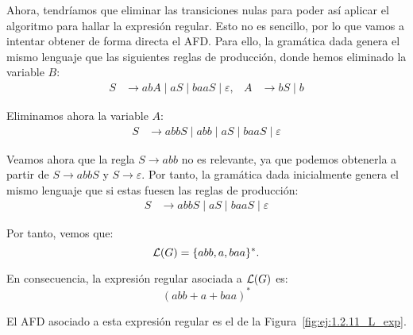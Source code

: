 \begin{ejercicio}
    Ahora, tendríamos que eliminar las transiciones nulas para poder así aplicar el algoritmo para hallar la expresión regular. Esto no es sencillo, por lo que vamos a intentar obtener de forma directa el AFD\@. Para ello, la gramática dada genera el mismo lenguaje que las siguientes reglas de producción, donde hemos eliminado la variable $B$:
    \begin{align*}
        S &\to abA \mid aS \mid baaS \mid \varepsilon, & A &\to bS \mid b
    \end{align*}

    Eliminamos ahora la variable $A$:
    \begin{align*}
        S &\to abbS \mid abb \mid aS \mid baaS \mid \varepsilon
    \end{align*}

    Veamos ahora que la regla $S \to abb$ no es relevante, ya que podemos obtenerla a partir de $S \to abbS$ y $S \to \varepsilon$. Por tanto, la gramática dada inicialmente genera el mismo lenguaje que si estas fuesen las reglas de producción:
    \begin{align*}
        S &\to abbS \mid aS \mid baaS \mid \varepsilon
    \end{align*}

    Por tanto, vemos que:
    \begin{equation*}
        \mathcal{L}(G)=\{abb, a, baa\}^*.
    \end{equation*}

    En consecuencia, la expresión regular asociada a $\mathcal{L}(G)$ es:
    \begin{equation*}
        (abb + a + baa)^*
    \end{equation*}

    El AFD asociado a esta expresión regular es el de la Figura~\ref{fig:ej:1.2.11_L_exp}.
    \begin{figure}
        \centering
\end{figure}
\end{ejercicio}
